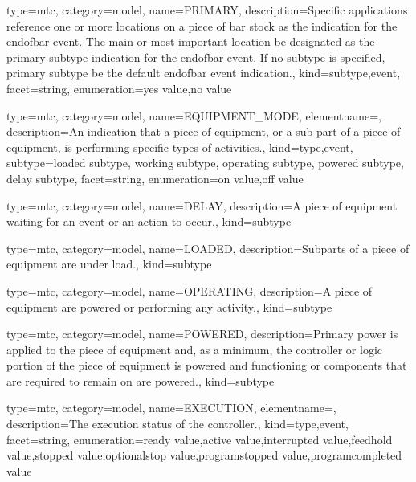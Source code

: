 {
  type=mtc,
  category=model,
  name={PRIMARY},
  description={Specific applications \MAY reference one or more locations on a piece of bar stock as the indication for the \gls{endofbar event}.  The main or most important location \must be designated as the \gls{primary subtype} indication for the \gls{endofbar event}.   \newline If no \gls{subtype} is specified, \gls{primary subtype} \must be the default \gls{endofbar event} indication.},
  kind={subtype,event},
  facet={\gls{string}},
  enumeration={\gls{yes value},\gls{no value}}
}


{
  type=mtc,
  category=model,
  name={EQUIPMENT\_MODE},
  elementname=,
  description={An indication that a piece of equipment, or a sub-part of a piece of equipment, is performing specific types of activities.},
  kind={type,event},
  subtype={\gls{loaded subtype}, \gls{working subtype}, \gls{operating subtype}, \gls{powered subtype}, \gls{delay subtype}},
  facet={\gls{string}},
  enumeration={\gls{on value},\gls{off value}}
}


{
  type=mtc,
  category=model,
  name={DELAY},
  description={A piece of equipment waiting for an event or an action to occur.},
  kind={subtype}
}


{
  type=mtc,
  category=model,
  name={LOADED},
  description={Subparts of a piece of equipment are under load.},
  kind={subtype}
}


{
  type=mtc,
  category=model,
  name={OPERATING},
  description={A piece of equipment are powered or performing any activity.},
  kind={subtype}
}


{
  type=mtc,
  category=model,
  name={POWERED},
  description={Primary  power is  applied  to the  piece  of  equipment and,  as  a minimum, the controller or logic portion of the piece of equipment is powered and functioning or components that are required to remain on are powered.},
  kind={subtype}
}



{
  type=mtc,
  category=model,
  name={EXECUTION},
  elementname=,
  description={The execution status of the \gls{controller}.},
  kind={type,event},
  facet={\gls{string}},
  enumeration={\gls{ready value},\gls{active value},\gls{interrupted value},\gls{feedhold value},\gls{stopped value},\gls{optionalstop value},\gls{programstopped value},\gls{programcompleted value}}
}


